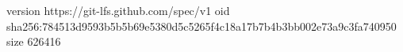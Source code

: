 version https://git-lfs.github.com/spec/v1
oid sha256:784513d9593b5b5b69e5380d5c5265f4c18a17b7b4b3bb002e73a9c3fa740950
size 626416
